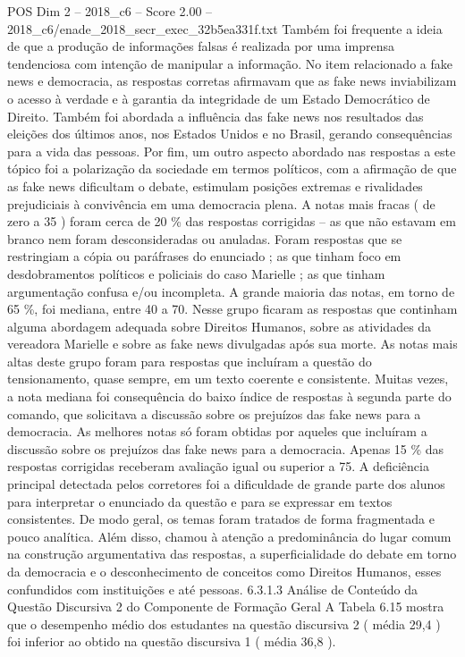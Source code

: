 \begin{textsample}{POS Dim 2 – 2018\_c6 – Score 2.00 – 2018\_c6/enade\_2018\_secr\_exec\_32b5ea331f.txt}
Também foi frequente a ideia de que a produção de informações falsas é realizada por uma imprensa tendenciosa com intenção de manipular a informação.
No item relacionado a fake news e democracia, as respostas corretas afirmavam que as fake news inviabilizam o acesso à verdade e à garantia da integridade de um Estado Democrático de Direito.
Também foi abordada a influência das fake news nos resultados das eleições dos últimos anos, nos Estados Unidos e no Brasil, gerando consequências para a vida das pessoas.
Por fim, um outro aspecto abordado nas respostas a este tópico foi a polarização da sociedade em termos políticos, com a afirmação de que as fake news dificultam o debate, estimulam posições extremas e rivalidades prejudiciais à convivência em uma democracia plena.
A notas mais fracas ( de zero a 35 ) foram cerca de 20 \% das respostas corrigidas – as que não estavam em branco nem foram desconsideradas ou anuladas.
Foram respostas que se restringiam a cópia ou paráfrases do enunciado ; as que tinham foco em desdobramentos políticos e policiais do caso Marielle ; as que tinham argumentação confusa e/ou incompleta.
A grande maioria das notas, em torno de 65 \%, foi mediana, entre 40 a 70.
Nesse grupo ficaram as respostas que continham alguma abordagem adequada sobre Direitos Humanos, sobre as atividades da vereadora Marielle e sobre as fake news divulgadas após sua morte.
As notas mais altas deste grupo foram para respostas que incluíram a questão do tensionamento, quase sempre, em um texto coerente e consistente.
Muitas vezes, a nota mediana foi consequência do baixo índice de respostas à segunda parte do comando, que solicitava a discussão sobre os prejuízos das fake news para a democracia.
As melhores notas só foram obtidas por aqueles que incluíram a discussão sobre os prejuízos das fake news para a democracia.
Apenas 15 \% das respostas corrigidas receberam avaliação igual ou superior a 75.
A deficiência principal detectada pelos corretores foi a dificuldade de grande parte dos alunos para interpretar o enunciado da questão e para se expressar em textos consistentes.
De modo geral, os temas foram tratados de forma fragmentada e pouco analítica.
Além disso, chamou à atenção a predominância do lugar comum na construção argumentativa das respostas, a superficialidade do debate em torno da democracia e o desconhecimento de conceitos como Direitos Humanos, esses confundidos com instituições e até pessoas. 6.3.1.3 Análise de Conteúdo da Questão Discursiva 2 do Componente de Formação Geral A Tabela 6.15 mostra que o desempenho médio dos estudantes na questão discursiva 2 ( média 29,4 ) foi inferior ao obtido na questão discursiva 1 ( média 36,8 ).

\end{textsample}
